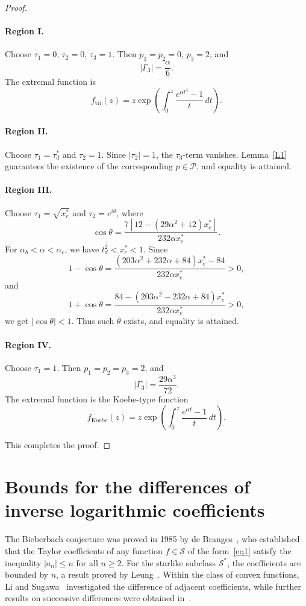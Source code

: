 \documentclass[11pt,reqno]{amsart}
\numberwithin{equation}{section}
\begin{document}
\begin{proof}
\paragraph{Region I.}
Choose $\tau_1=0$, $\tau_2=0$, $\tau_3=1$. Then $p_1=p_2=0$, $p_3=2$, and
\[
|\Gamma_3|=\frac{\alpha}{6}.
\]
The extremal function is
\[
f_{\mathrm{tri}}(z)
=
z\exp\left(
\int_0^z \frac{e^{\alpha t^3}-1}{t}\,dt
\right).
\]

\paragraph{Region II.}
Choose $\tau_1=\tau_d^*$ and $\tau_2=1$. Since $|\tau_2|=1$, the $\tau_3$-term vanishes. Lemma~\ref{L1} guarantees the existence of the corresponding $p\in\mathcal{P}$, and equality is attained.

\paragraph{Region III.}
Choose $\tau_1=\sqrt{x_e^*}$ and $\tau_2=e^{i\theta}$, where
\[
\cos\theta
=
\frac{7\left[12-(29\alpha^2+12)x_e^*\right]}
{232\alpha x_e^*}.
\]
For $\alpha_b<\alpha<\alpha_c$, we have $t_d^2<x_e^*<1$. Since
\[
1-\cos\theta
=
\frac{
(203\alpha^2+232\alpha+84)x_e^*-84
}
{232\alpha x_e^*}
>0,
\]
and
\[
1+\cos\theta
=
\frac{
84-(203\alpha^2-232\alpha+84)x_e^*
}
{232\alpha x_e^*}
>0,
\]
we get $|\cos\theta|<1$. Thus such $\theta$ exists, and equality is attained.

\paragraph{Region IV.}
Choose $\tau_1=1$. Then $p_1=p_2=p_3=2$, and
\[
|\Gamma_3|=\frac{29\alpha^3}{72}.
\]
The extremal function is the Koebe-type function
\[
f_{\mathrm{Koebe}}(z)
=
z\exp\left(
\int_0^z \frac{e^{\alpha t}-1}{t}\,dt
\right).
\]

This completes the proof.
\end{proof}
\section{Bounds for the differences of inverse logarithmic coefficients}
The Bieberbach conjecture was proved in 1985 by de Branges~\cite{LDB1}, who established that the Taylor coefficients of any function $f \in \mathcal{S}$ of the form~\eqref{eq1} satisfy the inequality $|a_n| \le n$ for all $n \ge 2$. For the starlike subclass $\mathcal{S}^\ast$, the coefficients are bounded by $n$, a result proved by Leung~\cite{Leung1978}. Within the class of convex functions, Li and Sugawa~\cite{LiSugawa} investigated the difference of adjacent coefficients, while further results on successive differences were obtained in~\cite{Peng2019, Arora2019, Arora2022, Arora2023}.
\end{document}
